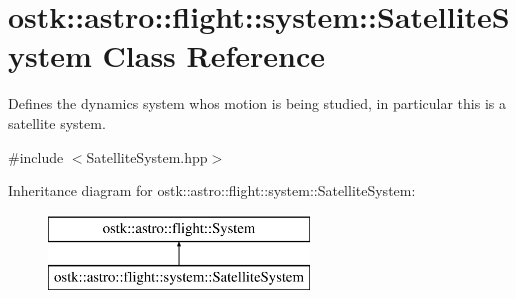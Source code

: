 \hypertarget{classostk_1_1astro_1_1flight_1_1system_1_1_satellite_system}{}\section{ostk\+:\+:astro\+:\+:flight\+:\+:system\+:\+:Satellite\+System Class Reference}
\label{classostk_1_1astro_1_1flight_1_1system_1_1_satellite_system}


Defines the dynamics system who\textquotesingle{}s motion is being studied, in particular this is a satellite system.  




{\ttfamily \#include $<$Satellite\+System.\+hpp$>$}

Inheritance diagram for ostk\+:\+:astro\+:\+:flight\+:\+:system\+:\+:Satellite\+System\+:\begin{figure}[H]
\begin{center}
\leavevmode
\includegraphics[height=2.000000cm]{classostk_1_1astro_1_1flight_1_1system_1_1_satellite_system}
\end{center}
\end{figure}
